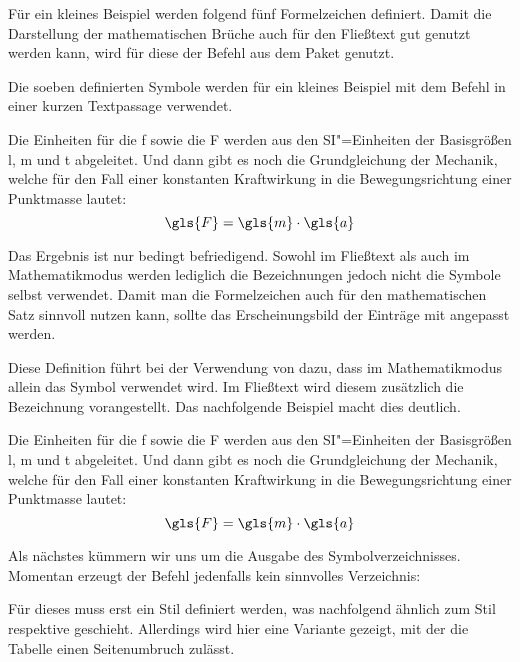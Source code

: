 \documentclass[%
  english,ngerman,%
  geometry=no,DIV=12,automark,%
]{tudscrartcl}
\begin{document}
Für ein kleines Beispiel werden folgend fünf Formelzeichen definiert. Damit die 
Darstellung der mathematischen Brüche auch für den Fließtext gut genutzt werden 
kann, wird für diese der Befehl  aus dem Paket  
genutzt.
%
\begin{Trunk*}

\end{Trunk*}
%
Die soeben definierten Symbole werden für ein kleines Beispiel mit dem Befehl 
 in einer kurzen Textpassage verwendet.
%
\begin{Hint*}
Die Einheiten für die \gls{f} sowie die \gls{F} werden aus den 
SI"=Einheiten der Basisgrößen \gls{l}, \gls{m} und \gls{t} abgeleitet.
Und dann gibt es noch die Grundgleichung der Mechanik, welche für den
Fall einer konstanten Kraftwirkung in die Bewegungsrichtung einer
Punktmasse lautet:
\[\gls{F} = \gls{m} \cdot \gls{a}\]
\end{Hint*}
%
Das Ergebnis ist nur bedingt befriedigend. Sowohl im Fließtext als auch im 
Mathematikmodus werden lediglich die Bezeichnungen jedoch nicht die Symbole 
selbst verwendet. Damit man die Formelzeichen auch für den mathematischen 
Satz sinnvoll nutzen kann, sollte das Erscheinungsbild der Einträge mit 
 angepasst werden.
%
\begin{Preamble*}
\end{Preamble*}
%
Diese Definition führt bei der Verwendung von  
dazu, dass im Mathematikmodus allein das Symbol verwendet wird. Im Fließtext 
wird diesem zusätzlich die Bezeichnung vorangestellt. Das nachfolgende Beispiel 
macht dies deutlich.
%
\begin{Trunk*}
Die Einheiten für die \gls{f} sowie die \gls{F} werden aus den
SI"=Einheiten der Basisgrößen \gls{l}, \gls{m} und \gls{t} abgeleitet.
Und dann gibt es noch die Grundgleichung der Mechanik, welche für den
Fall einer konstanten Kraftwirkung in die Bewegungsrichtung einer
Punktmasse lautet:
\[\gls{F} = \gls{m} \cdot \gls{a}\]

\end{Trunk*}
%
Als nächstes kümmern wir uns um die Ausgabe des Symbolverzeichnisses. Momentan 
erzeugt der Befehl  jedenfalls kein sinnvolles Verzeichnis:
%
\begin{Hint}
\printsymbols
\end{Hint}
\begin{quoting}[rightmargin=0pt]
\vspace*{-\baselineskipglue}
\glsdisablehyper
\InputCode
\end{quoting}
%
Für dieses muss erst ein Stil definiert werden, was nachfolgend ähnlich zum 
Stil  respektive  geschieht. Allerdings 
wird hier eine Variante gezeigt, mit der die Tabelle einen Seitenumbruch 
zulässt.
\end{document}
